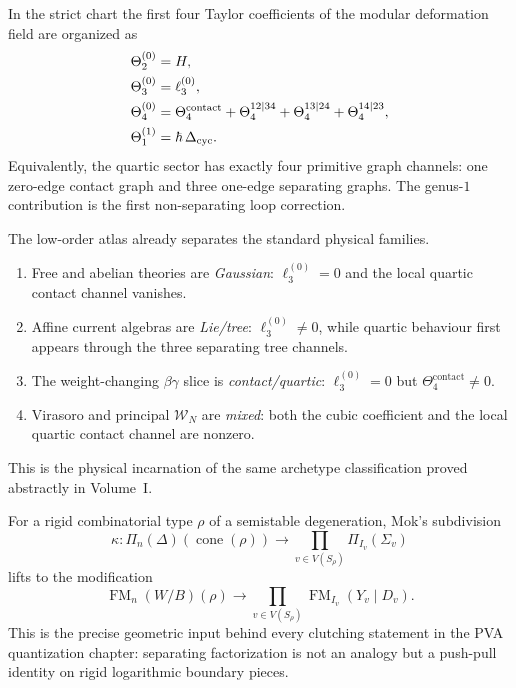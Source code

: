 \begin{proposition}
\label{prop:vol2-quartic-channels-and-loop-term}
In the strict chart the first four Taylor coefficients of the modular deformation field are organized as
\begin{align}
\label{eq:vol2-low-order-atlas}
\Theta_{2}^{(0)} &= H,
\notag\\
\Theta_{3}^{(0)} &= \ell_3^{(0)},
\notag\\
\Theta_{4}^{(0)} &= \Theta_{4}^{\mathrm{contact}} + \Theta_{4}^{12\mid 34} + \Theta_{4}^{13\mid 24} + \Theta_{4}^{14\mid 23},
\notag\\
\Theta_{1}^{(1)} &= \hbar\,\Delta_{\mathrm{cyc}}.
\end{align}
Equivalently, the quartic sector has exactly four primitive graph channels: one zero-edge contact graph and
three one-edge separating graphs.  The genus-$1$ contribution is the first non-separating loop correction.
\end{proposition}

\begin{remark}
\label{rem:vol2-family-by-family-low-order-atlas}
The low-order atlas already separates the standard physical families.
\begin{enumerate}[label=\textup{(\roman*)}]
\item Free and abelian theories are \emph{Gaussian}: $\ell_3^{(0)}=0$ and the local quartic contact channel vanishes.
\item Affine current algebras are \emph{Lie/tree}: $\ell_3^{(0)}\neq 0$, while quartic behaviour first appears through the three separating tree channels.
\item The weight-changing $\beta\gamma$ slice is \emph{contact/quartic}: $\ell_3^{(0)}=0$ but $\Theta_4^{\mathrm{contact}}\neq 0$.
\item Virasoro and principal $\mathcal W_N$ are \emph{mixed}: both the cubic coefficient and the local quartic contact channel are nonzero.
\end{enumerate}
This is the physical incarnation of the same archetype classification proved abstractly in Volume~I.
\end{remark}

\begin{remark}
\label{rem:vol2-mok-cutting-map-factorization}
For a rigid combinatorial type $\rho$ of a semistable degeneration, Mok's subdivision
\[
\kappa\colon \Pi_n(\Delta)(\operatorname{cone}(\rho))\to \prod_{v\in V(S_\rho)}\Pi_{I_v}(\Sigma_v)
\]
lifts to the modification
\[
\operatorname{FM}_n(W/B)(\rho)\to \prod_{v\in V(S_\rho)}\operatorname{FM}_{I_v}(Y_v\mathbin{|}D_v).
\]
This is the precise geometric input behind every clutching statement in the PVA quantization chapter:
separating factorization is not an analogy but a push-pull identity on rigid logarithmic boundary pieces.
\end{remark}

